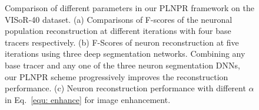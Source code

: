 \begin{figure}[t]
	\centering
	\caption{ Comparison of different parameters in our PLNPR framework on the VISoR-40 dataset.
		(a) Comparisons of F-scores of the neuronal population reconstruction at different iterations with four base tracers respectively. 
		(b) F-Scores of neuron reconstruction at five iterations using three deep segmentation networks. 
		Combining any base tracer and any one of the three neuron segmentation DNNs, our PLNPR scheme progressively improves the reconstruction performance.
		(c) Neuron reconstruction performance with different $\alpha$ in Eq.~\eqref{equ: enhance} for image enhancement.} %
	
	\label{fig:ablation_study_plnpr}
\end{figure}


